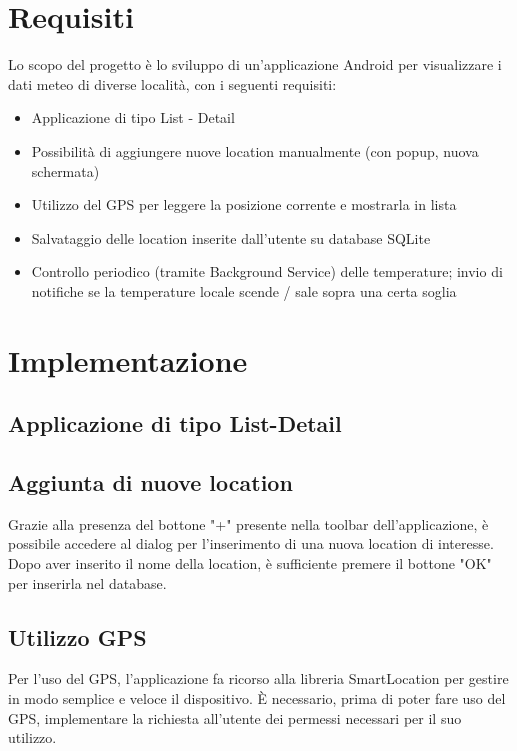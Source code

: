 \documentclass[twoside]{supsistudent}
\begin{document}
\maketitle
\onehalfspacing
\frontmatter


\tableofcontents


\newpage
\mainmatter
{}
\setcounter{page}{1}

\chapter{Requisiti}
Lo scopo del progetto è lo sviluppo di un'applicazione Android per visualizzare i dati meteo di diverse località, con i seguenti requisiti:
\begin{itemize}
\item Applicazione di tipo List - Detail
\item Possibilità di aggiungere nuove location manualmente (con popup, nuova schermata)
\item Utilizzo del GPS per leggere la posizione corrente e mostrarla in lista
\item Salvataggio delle location inserite dall'utente su database SQLite
\item Controllo periodico (tramite Background Service) delle temperature; invio di notifiche se la temperature locale scende / sale sopra una certa soglia
\end{itemize}


\chapter{Implementazione}


\section{Applicazione di tipo List-Detail}
\lipsum[13]


\section{Aggiunta di nuove location}
Grazie alla presenza del bottone "+" presente nella toolbar dell'applicazione, è possibile accedere al dialog per l'inserimento di una nuova location di interesse. Dopo aver inserito il nome della location, è sufficiente premere il bottone "OK" per inserirla nel database.

\section{Utilizzo GPS}
Per l'uso del GPS, l'applicazione fa ricorso alla libreria SmartLocation per gestire in modo semplice e veloce il dispositivo. \`E necessario, prima di poter fare uso del GPS, implementare la richiesta all'utente dei permessi necessari per il suo utilizzo.
\end{document}
